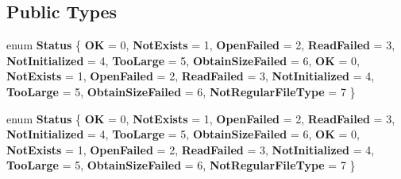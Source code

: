 \subsection*{Public Types}
\begin{DoxyCompactItemize}
\item 
\mbox{\label{classFileUtils_af39c06edc762abeeb425b6f9fc09a637}} 
enum {\bfseries Status} \{ \newline
{\bfseries OK} = 0, 
{\bfseries Not\+Exists} = 1, 
{\bfseries Open\+Failed} = 2, 
{\bfseries Read\+Failed} = 3, 
\newline
{\bfseries Not\+Initialized} = 4, 
{\bfseries Too\+Large} = 5, 
{\bfseries Obtain\+Size\+Failed} = 6, 
{\bfseries OK} = 0, 
\newline
{\bfseries Not\+Exists} = 1, 
{\bfseries Open\+Failed} = 2, 
{\bfseries Read\+Failed} = 3, 
{\bfseries Not\+Initialized} = 4, 
\newline
{\bfseries Too\+Large} = 5, 
{\bfseries Obtain\+Size\+Failed} = 6, 
{\bfseries Not\+Regular\+File\+Type} = 7
 \}
\item 
\mbox{\label{classFileUtils_af39c06edc762abeeb425b6f9fc09a637}} 
enum {\bfseries Status} \{ \newline
{\bfseries OK} = 0, 
{\bfseries Not\+Exists} = 1, 
{\bfseries Open\+Failed} = 2, 
{\bfseries Read\+Failed} = 3, 
\newline
{\bfseries Not\+Initialized} = 4, 
{\bfseries Too\+Large} = 5, 
{\bfseries Obtain\+Size\+Failed} = 6, 
{\bfseries OK} = 0, 
\newline
{\bfseries Not\+Exists} = 1, 
{\bfseries Open\+Failed} = 2, 
{\bfseries Read\+Failed} = 3, 
{\bfseries Not\+Initialized} = 4, 
\newline
{\bfseries Too\+Large} = 5, 
{\bfseries Obtain\+Size\+Failed} = 6, 
{\bfseries Not\+Regular\+File\+Type} = 7
 \}
\end{DoxyCompactItemize}
